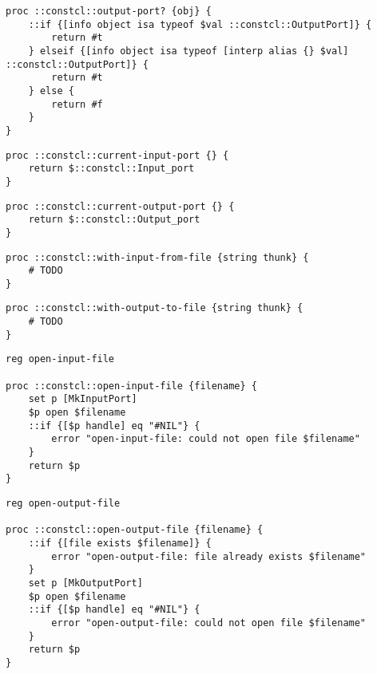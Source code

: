 \documentclass{report}
\begin{document}
\noindent\makebox[\linewidth]{\rule{\linewidth}{0.4pt}}
\noindent\makebox[\linewidth]{\rule{\linewidth}{0.4pt}}
\begin{lstlisting}
proc ::constcl::output-port? {obj} {
    ::if {[info object isa typeof $val ::constcl::OutputPort]} {
        return #t
    } elseif {[info object isa typeof [interp alias {} $val] ::constcl::OutputPort]} {
        return #t
    } else {
        return #f
    }
}
\end{lstlisting}
\noindent\makebox[\linewidth]{\rule{\linewidth}{0.4pt}}
\noindent\makebox[\linewidth]{\rule{\linewidth}{0.4pt}}
\begin{lstlisting}
proc ::constcl::current-input-port {} {
    return $::constcl::Input_port
}
\end{lstlisting}
\noindent\makebox[\linewidth]{\rule{\linewidth}{0.4pt}}
\noindent\makebox[\linewidth]{\rule{\linewidth}{0.4pt}}
\begin{lstlisting}
proc ::constcl::current-output-port {} {
    return $::constcl::Output_port
}
\end{lstlisting}
\noindent\makebox[\linewidth]{\rule{\linewidth}{0.4pt}}
\noindent\makebox[\linewidth]{\rule{\linewidth}{0.4pt}}
\begin{lstlisting}
proc ::constcl::with-input-from-file {string thunk} {
    # TODO
}
\end{lstlisting}
\noindent\makebox[\linewidth]{\rule{\linewidth}{0.4pt}}
\noindent\makebox[\linewidth]{\rule{\linewidth}{0.4pt}}
\begin{lstlisting}
proc ::constcl::with-output-to-file {string thunk} {
    # TODO
}
\end{lstlisting}
\noindent\makebox[\linewidth]{\rule{\linewidth}{0.4pt}}
\noindent\makebox[\linewidth]{\rule{\linewidth}{0.4pt}}
\begin{lstlisting}
reg open-input-file
 
proc ::constcl::open-input-file {filename} {
    set p [MkInputPort]
    $p open $filename
    ::if {[$p handle] eq "#NIL"} {
        error "open-input-file: could not open file $filename"
    }
    return $p
}
\end{lstlisting}
\noindent\makebox[\linewidth]{\rule{\linewidth}{0.4pt}}
\noindent\makebox[\linewidth]{\rule{\linewidth}{0.4pt}}
\begin{lstlisting}
reg open-output-file
 
proc ::constcl::open-output-file {filename} {
    ::if {[file exists $filename]} {
        error "open-output-file: file already exists $filename"
    }
    set p [MkOutputPort]
    $p open $filename
    ::if {[$p handle] eq "#NIL"} {
        error "open-output-file: could not open file $filename"
    }
    return $p
}
\end{lstlisting}
\end{document}
